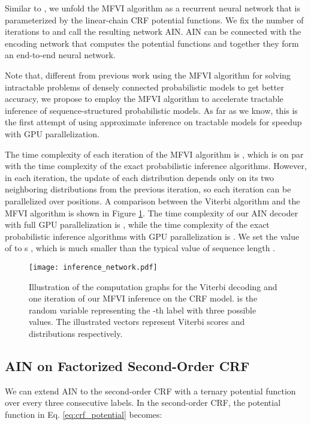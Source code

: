\documentclass[11pt,a4paper]{article}
\begin{document}
Similar to \citet{zheng2015conditional}, we unfold the MFVI algorithm as a recurrent neural network that is parameterized by the linear-chain CRF potential functions. We fix the number of iterations to  and call the resulting network AIN. AIN can be connected with the encoding network that computes the potential functions and together they form an end-to-end neural network. 

Note that, different from previous work \cite{NIPS2011_4296,zheng2015conditional,baque2016principled,7913730,wang-etal-2019-second} using the MFVI algorithm for solving intractable problems of densely connected probabilistic models to get better accuracy, we propose to employ the MFVI algorithm to accelerate tractable inference of sequence-structured probabilistic models. As far as we know, this is the first attempt of using approximate inference on tractable models for speedup with GPU parallelization.

The time complexity of each iteration of the MFVI algorithm is , which is on par with the time complexity of the exact probabilistic inference algorithms. However, in each iteration, the update of each distribution  depends only on its two neighboring distributions from the previous iteration, so each iteration can be parallelized over positions. A comparison between the Viterbi algorithm and the MFVI algorithm is shown in Figure \ref{fig:inf_compare}. The time complexity of our AIN decoder with full GPU parallelization is , while the time complexity of the exact probabilistic inference algorithms with GPU parallelization is . We set the value of  to s , which is much smaller than the typical value of sequence length .

\begin{figure}[t]
\centering
\texttt{[image: inference\_network.pdf]}
\caption{Illustration of the computation graphs for the Viterbi decoding and one iteration of our MFVI inference on the CRF model.  is the random variable representing the -th label with three possible values. The illustrated vectors represent Viterbi scores and  distributions respectively.}
\label{fig:inf_compare}
\end{figure}

\subsection{AIN on Factorized Second-Order CRF}
\label{sec:second-order}

We can extend AIN to the second-order CRF with a ternary potential function over every three consecutive labels. In the second-order CRF, the potential function in Eq. \ref{eq:crf_potential} becomes:
\end{document}
